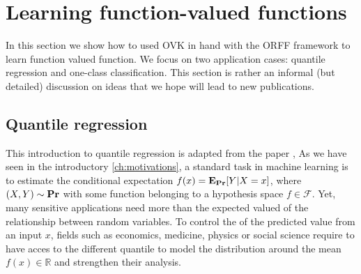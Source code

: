 \section{Learning function-valued functions}
In this section we show how to used \acs{OVK} in hand with the \acs{ORFF}
framework to learn function valued function. We focus on two application cases:
quantile regression and one-class classification. This section is rather an
informal (but detailed) discussion on ideas that we hope will lead to new
publications.
\subsection{Quantile regression}
\label{subsec:quantile_regression}
This introduction to quantile regression is adapted from the paper
\citet{sangnier2016joint}, As we have seen in the introductory
\cref{ch:motivations}, a standard task in machine learning is to estimate the
conditional expectation $f(x)={\mathbf{{E}}}_{{\mathbf{{Pr}}}}[Y | X = x]$, where
$(X,Y)\sim{\mathbf{{Pr}}}$ with some function belonging to a hypothesis space
$f\in\mathcal{F}$. Yet, many sensitive applications need more than the expected
valued of the relationship between random variables. To control the
 of the predicted value from an input $x$, fields such as
economics, medicine, physics or social science require to have acces to the
different quantile to model the distribution around the mean
$f(x)\in\mathbb{R}$ and strengthen their analysis.

